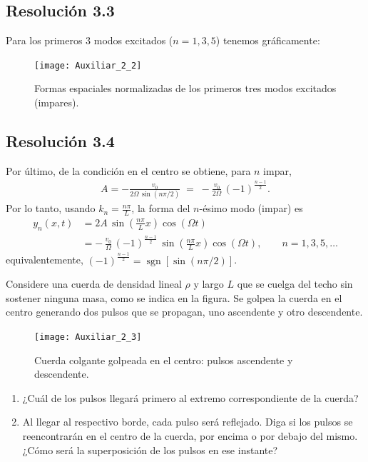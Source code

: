 \documentclass[
  11pt,
  letterpaper,
   addpoints,
   answers
  ]{exam}
\begin{document}
\begin{questions}
\begin{solution}
\subsection*{Resolución 3.3}
Para los primeros 3 modos excitados ($n=1,3,5$) tenemos gráficamente:
\begin{figure}[H]
  \centering
  \texttt{[image: Auxiliar\_2\_2]}
  \caption{Formas espaciales normalizadas de los primeros tres modos excitados (impares).}
  \label{fig:modos}
\end{figure}
\subsection*{Resolución 3.4}
Por último, de la condición en el centro se obtiene, para $n$ impar,
\begin{align}
  A = -\frac{v_0}{2\Omega\,\sin(n\pi/2)} \;=\; -\frac{v_0}{2\Omega}\,(-1)^{\frac{n-1}{2}}.
\end{align}
Por lo tanto, usando $k_n=\tfrac{n\pi}{L}$, la forma del $n$-ésimo modo (impar) es
\begin{align}
  y_n(x,t) 
  &= 2A\,\sin\!\left(\frac{n\pi}{L}x\right)\cos(\Omega t)\\
  &= -\,\frac{v_0}{\Omega}\,(-1)^{\frac{n-1}{2}}\,\sin\!\left(\frac{n\pi}{L}x\right)\cos(\Omega t),\qquad n=1,3,5,\dots
\end{align}
equivalentemente, $(-1)^{\frac{n-1}{2}}=\operatorname{sgn}[\sin(n\pi/2)]$.
\end{solution}
\question Considere una cuerda de densidad lineal $\rho$ y largo $L$ que se cuelga del techo
sin sostener ninguna masa, como se indica en la figura. Se golpea la cuerda en el
centro generando dos pulsos que se propagan, uno ascendente y otro descendente.
\begin{figure}[H]
  \centering
  \texttt{[image: Auxiliar\_2\_3]}
  \caption{Cuerda colgante golpeada en el centro: pulsos ascendente y descendente.}
  \label{fig:cuerda-colgante}
\end{figure}

\begin{enumerate}
  \item ¿Cuál de los pulsos llegará primero al extremo correspondiente de la cuerda?
  \item Al llegar al respectivo borde, cada pulso será reflejado. Diga si los pulsos se reencontrarán en el centro de la cuerda, por encima o por debajo del mismo. ¿Cómo será la superposición de los pulsos en ese instante?
\end{enumerate}
\begin{solution}

\end{solution}
\end{questions}
\end{document}
